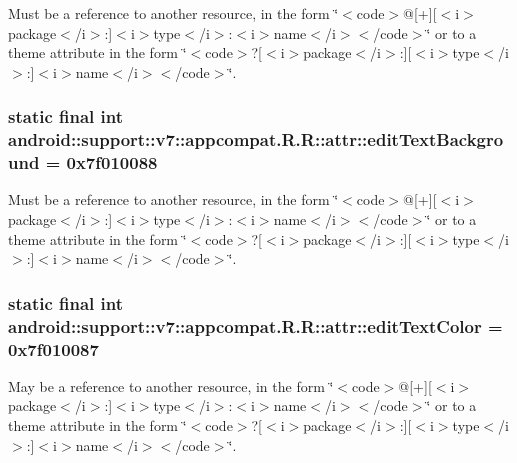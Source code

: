 Must be a reference to another resource, in the form \char`\"{}$<$code$>$@\mbox{[}+\mbox{]}\mbox{[}$<$i$>$package$<$/i$>$:\mbox{]}$<$i$>$type$<$/i$>$:$<$i$>$name$<$/i$>$$<$/code$>$\char`\"{} or to a theme attribute in the form \char`\"{}$<$code$>$?\mbox{[}$<$i$>$package$<$/i$>$:\mbox{]}\mbox{[}$<$i$>$type$<$/i$>$:\mbox{]}$<$i$>$name$<$/i$>$$<$/code$>$\char`\"{}. \hypertarget{classandroid_1_1support_1_1v7_1_1appcompat_1_1_r_1_1attr_f74b90cd065cc21a110da0715d1da7d5}{
\subsubsection[{editTextBackground}]{\setlength{\rightskip}{0pt plus 5cm}static final int android::support::v7::appcompat.R.R::attr::editTextBackground = 0x7f010088}}
\label{classandroid_1_1support_1_1v7_1_1appcompat_1_1_r_1_1attr_f74b90cd065cc21a110da0715d1da7d5}


Must be a reference to another resource, in the form \char`\"{}$<$code$>$@\mbox{[}+\mbox{]}\mbox{[}$<$i$>$package$<$/i$>$:\mbox{]}$<$i$>$type$<$/i$>$:$<$i$>$name$<$/i$>$$<$/code$>$\char`\"{} or to a theme attribute in the form \char`\"{}$<$code$>$?\mbox{[}$<$i$>$package$<$/i$>$:\mbox{]}\mbox{[}$<$i$>$type$<$/i$>$:\mbox{]}$<$i$>$name$<$/i$>$$<$/code$>$\char`\"{}. \hypertarget{classandroid_1_1support_1_1v7_1_1appcompat_1_1_r_1_1attr_0500ec42007cd7fecc80662a3795ee3a}{
\subsubsection[{editTextColor}]{\setlength{\rightskip}{0pt plus 5cm}static final int android::support::v7::appcompat.R.R::attr::editTextColor = 0x7f010087}}
\label{classandroid_1_1support_1_1v7_1_1appcompat_1_1_r_1_1attr_0500ec42007cd7fecc80662a3795ee3a}


May be a reference to another resource, in the form \char`\"{}$<$code$>$@\mbox{[}+\mbox{]}\mbox{[}$<$i$>$package$<$/i$>$:\mbox{]}$<$i$>$type$<$/i$>$:$<$i$>$name$<$/i$>$$<$/code$>$\char`\"{} or to a theme attribute in the form \char`\"{}$<$code$>$?\mbox{[}$<$i$>$package$<$/i$>$:\mbox{]}\mbox{[}$<$i$>$type$<$/i$>$:\mbox{]}$<$i$>$name$<$/i$>$$<$/code$>$\char`\"{}. 

